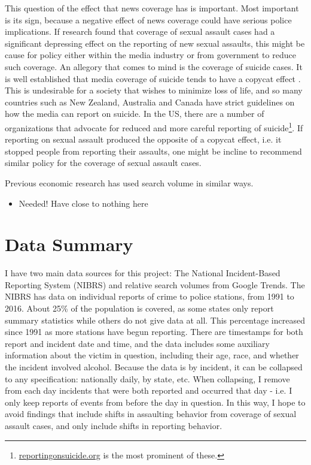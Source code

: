 \documentclass[AER,draftmode]{AEA}
\begin{document}
This question of the effect that news coverage has is important. Most important is its sign, because a negative effect of news coverage could have serious police implications. If research found that coverage of sexual assault cases had a significant depressing effect on the reporting of new sexual assaults, this might be cause for policy either within the media industry or from government to reduce such coverage. An allegory that comes to mind is the coverage of suicide cases. It is well established that media coverage of suicide tends to have a copycat effect \cite{stack_media_2003}. This is undesirable for a society that wishes to minimize loss of life, and so many countries such as New Zealand, Australia and Canada have strict guidelines on how the media can report on suicide. In the US, there are a number of organizations that advocate for reduced and more careful reporting of suicide\footnote{\url{reportingonsuicide.org} is the most prominent of these.}. If reporting on sexual assault produced the opposite of a copycat effect, i.e. it stopped people from reporting their assaults, one might be incline to recommend similar policy for the coverage of sexual assault cases. 

Previous economic research has used search volume in similar ways.
\begin{itemize}
    \item Needed! Have close to nothing here
\end{itemize}

\section{Data Summary}

I have two main data sources for this project: The National Incident-Based Reporting System (NIBRS) and relative search volumes from Google Trends. The NIBRS has data on individual reports of crime to police stations, from 1991 to 2016. About 25\% of the population is covered, as some states only report summary statistics while others do not give data at all. This percentage increased since 1991 as more stations have begun reporting. There are timestamps for both report and incident date and time, and the data includes some auxiliary information about the victim in question, including their age, race, and whether the incident involved alcohol. Because the data is by incident, it can be collapsed to any specification: nationally daily, by state, etc. When collapsing, I remove from each day incidents that were both reported and occurred that day - i.e. I only keep reports of events from before the day in question. In this way, I hope to avoid findings that include shifts in assaulting behavior from coverage of sexual assault cases, and only include shifts in reporting behavior. 
\end{document}
